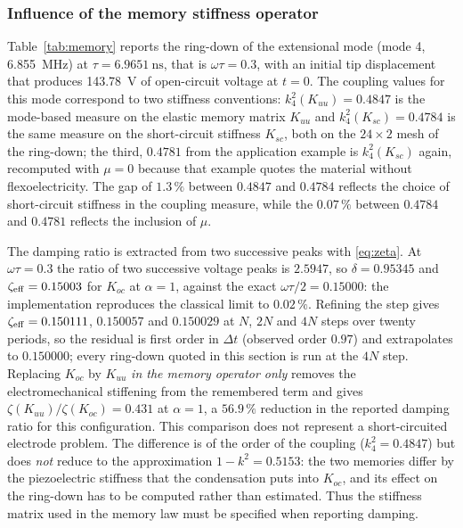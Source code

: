 \subsubsection{Influence of the memory stiffness operator}

Table~\ref{tab:memory} reports the ring-down of the extensional mode (mode 4,
\SI{6.855}{MHz}) at $\tau=\SI{6.9651}{\nano\second}$, that is $\omega\tau=0.3$,
with an initial tip displacement that produces \SI{143.78}{\volt} of
open-circuit voltage at $t=0$. The coupling values for this mode correspond to two stiffness
conventions:
$k^2_{4}(K_{uu})=0.4847$ is the mode-based measure on the elastic memory matrix
$K_{uu}$ and $k^2_{4}(K_{sc})=0.4784$ is the same measure on the short-circuit
stiffness $K_{sc}$, both on the $24\times2$ mesh of the ring-down; the third,
$0.4781$ from the application example is $k^2_{4}(K_{sc})$ again,
recomputed with $\mu=0$ because that example quotes the material without
flexoelectricity. The gap of $1.3\,\%$ between $0.4847$ and $0.4784$ reflects the
choice of short-circuit stiffness in the coupling measure, while the
$0.07\,\%$ between $0.4784$ and $0.4781$ reflects the inclusion of $\mu$.

The damping ratio is extracted from two successive peaks with
\eqref{eq:zeta}. At $\omega\tau=0.3$ the ratio of
two successive voltage peaks is $2.5947$, so $\delta=0.95345$ and
$\zeta_{\rm eff}=0.15003$ for $K_{oc}$ at $\alpha=1$, against the exact
$\omega\tau/2=0.15000$: the implementation reproduces the classical limit to
$0.02\,\%$. Refining the step gives $\zeta_{\rm eff}=0.150111$, $0.150057$ and
$0.150029$ at $N$, $2N$ and $4N$ steps over twenty periods, so the residual is
first order in $\Delta t$ (observed order $0.97$) and extrapolates to
$0.150000$; every ring-down quoted in this section is run at the $4N$ step.
Replacing $K_{oc}$ by $K_{uu}$ \emph{in the memory operator only}
removes the electromechanical stiffening from the remembered term and gives
$\zeta(K_{uu})/\zeta(K_{oc})=0.431$ at $\alpha=1$, a $56.9\,\%$
reduction in the reported damping ratio for this configuration. This
comparison does not represent a short-circuited electrode problem. The
difference is of the order of the coupling ($k^2_{4}=0.4847$) but does
\emph{not} reduce to the approximation $1-k^2=0.5153$: the two memories differ by
the piezoelectric stiffness that the condensation puts into $K_{oc}$, and
its effect on the ring-down has to be computed rather than estimated. Thus the stiffness matrix used in the memory law must be specified
when reporting damping.

